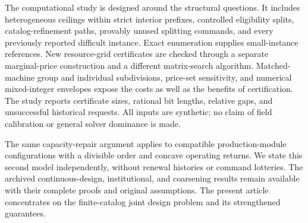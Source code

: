 The computational study is designed around the structural questions. It includes heterogeneous ceilings within strict interior prefixes, controlled eligibility splits, catalog-refinement paths, provably unused splitting commands, and every previously reported difficult instance. Exact enumeration supplies small-instance references. New resource-grid certificates are checked through a separate marginal-price construction and a different matrix-search algorithm. Matched-machine group and individual subdivisions, price-set sensitivity, and numerical mixed-integer envelopes expose the costs as well as the benefits of certification. The study reports certificate sizes, rational bit lengths, relative gaps, and unsuccessful historical requests. All inputs are synthetic; no claim of field calibration or general solver dominance is made.

The same capacity-repair argument applies to compatible production-module configurations with a divisible order and concave operating returns. We state this second model independently, without renewal histories or command lotteries. The archived continuous-design, institutional, and coarsening results remain available with their complete proofs and original assumptions. The present article concentrates on the finite-catalog joint design problem and its strengthened guarantees.
